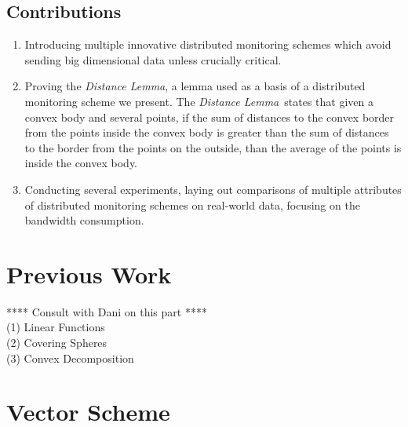 \documentclass[10pt, conference]{IEEEtran}
\newcommand{\distanceLemma}{\textit{Distance Lemma}}
\begin{document}
\subsection{Contributions}
\begin{enumerate}
\item Introducing multiple innovative distributed monitoring schemes which avoid sending big dimensional data unless crucially critical.
\item Proving the \distanceLemma , a lemma used as a basis of a distributed monitoring scheme we present. The \distanceLemma \ states that given a convex body and several points, if the sum of distances to the convex border from the points inside the convex body is greater than the sum of distances to the border from the points on the outside, than the average of the points is inside the convex body.
\item Conducting several experiments, laying out comparisons of multiple attributes of distributed monitoring schemes on real-world data, focusing on the bandwidth consumption.
\end{enumerate}

\section{Previous Work}
**** Consult with Dani on this part **** \\

(1) Linear Functions \\
(2) Covering Spheres \\
(3) Convex Decomposition
\section{Vector Scheme}
\end{document}
